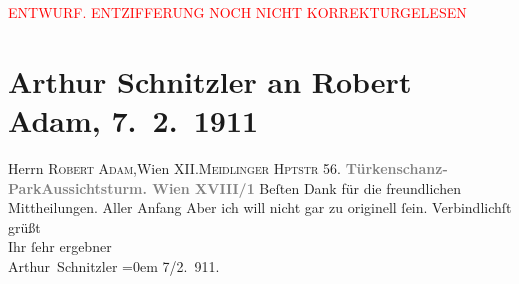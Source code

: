 
\begin{center}
            \textcolor{red}{ENTWURF. ENTZIFFERUNG NOCH NICHT KORREKTURGELESEN}
                      \end{center}
            
               \section[Arthur Schnitzler an Robert Adam, 7. 2. 1911]{ Arthur Schnitzler an Robert Adam, 7. 2. 1911}\nopagebreak{}\rehead{ }\begin{ledgroupsized}[t]{13cm}\normalsize\beginnumbering{} \toendnotes[C]{\smallbreak\pagebreak[2]} 
\pstart{}{\pb}Herrn \textsc{Robert
                        Adam},\pend{}\pstart{}Wien XII.\pend{}\pstart{}\textsc{Meidlinger Hptstr} 56.\pend{}{\bigskip}\pstart
           \noindent{}\centering{}{\pb}\textcolor{gray}{\textbf{Türkenschanz-ParkAussichtsturm. Wien XVIII/1}}\pend
           \pstart
           {\pb}Beſten Dank für die freundlichen Mittheilungen. Aller
                    Anfang {\dotsfour} Aber ich will nicht gar zu originell
                    ſein.\pend
           \pstart
           Verbindlichſt grüßt{\\[\baselineskip]}Ihr ſehr ergebner{\\[\baselineskip]}\spacefill\mbox{Arthur Schnitzler}\pend
           \leftskip=0em{}\pstart
           \raggedleft{}7/2. 911.\pend
           \endnumbering{}\end{ledgroupsized}  \newcommand{\dateiname}{L02004}\newcommand{\titel}{Arthur Schnitzler an Robert Adam, 7. 2. 1911}\newcommand{\editorInnen}{Martin Anton Müller und Gerd-Hermann Susen}
      